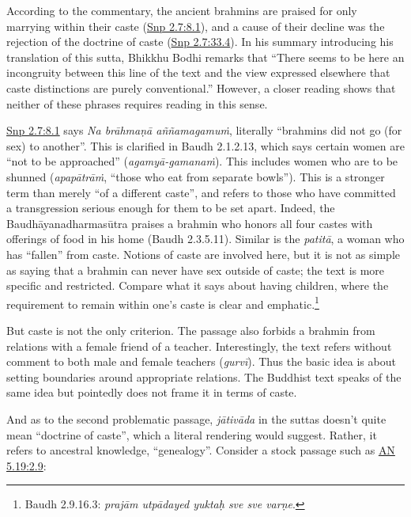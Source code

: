 \documentclass[12pt,openany]{book}%
\begin{document}
According to the commentary, the ancient brahmins are praised for only marrying within their caste (\href{https://suttacentral.net/snp2.7/en/sujato\#8.1}{Snp 2.7:8.1}), and a cause of their decline was the rejection of the doctrine of caste (\href{https://suttacentral.net/snp2.7/en/sujato\#33.4}{Snp 2.7:33.4}). In his summary introducing his translation of this sutta, Bhikkhu Bodhi remarks that “There seems to be here an incongruity between this line of the text and the view expressed elsewhere that caste distinctions are purely conventional.” However, a closer reading shows that neither of these phrases requires reading in this sense.

\href{https://suttacentral.net/snp2.7/en/sujato\#8.1}{Snp 2.7:8.1} says \textit{Na \textsanskrit{brāhmaṇā} \textsanskrit{aññamagamuṁ}}, literally “brahmins did not go (for sex) to another”. This is clarified in Baudh 2.1.2.13, which says certain women are “not to be approached” (\textit{\textsanskrit{agamyā}-\textsanskrit{gamanaṁ}}). This includes women who are to be shunned (\textit{\textsanskrit{apapātrāṁ}}, “those who eat from separate bowls”). This is a stronger term than merely “of a different caste”, and refers to those who have committed a transgression serious enough for them to be set apart. Indeed, the \textsanskrit{Baudhāyanadharmasūtra} praises a brahmin who honors all four castes with offerings of food in his home (Baudh 2.3.5.11). Similar is the \textit{\textsanskrit{patitā}}, a woman who has “fallen” from caste. Notions of caste are involved here, but it is not as simple as saying that a brahmin can never have sex outside of caste; the text is more specific and restricted. Compare what it says about having children, where the requirement to remain within one’s caste is clear and emphatic.\footnote{Baudh 2.9.16.3: \textit{\textsanskrit{prajām} \textsanskrit{utpādayed} yuktaḥ sve sve \textsanskrit{varṇe}}. }

But caste is not the only criterion. The passage also forbids a brahmin from relations with a female friend of a teacher. Interestingly, the text refers without comment to both male and female teachers (\textit{\textsanskrit{gurvī}}). Thus the basic idea is about setting boundaries around appropriate relations. The Buddhist text speaks of the same idea but pointedly does not frame it in terms of caste.

And as to the second problematic passage, \textit{\textsanskrit{jātivāda}} in the suttas doesn’t quite mean “doctrine of caste”, which a literal rendering would suggest. Rather, it refers to ancestral knowledge, “genealogy”. Consider a stock passage such as \href{https://suttacentral.net/an5.19/en/sujato\#2.9}{AN 5.19:2.9}:
\end{document}
